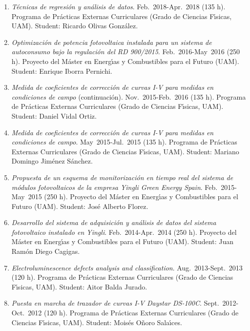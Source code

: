 \documentclass{article}
\begin{document}
\begin{enumerate}
\item
{\it T\'ecnicas de regresi\'on y an\'alisis de datos}.
Feb.~2018-Apr.~2018 (135 h). Programa de Pr\'acticas Externas Curriculares (Grado de Ciencias F{\'\i}sicas, UAM).
Student: Ricardo Olivas Gonz\'alez.

\item
{\it Optimizaci\'on de potencia fotovoltaica instalada para un sistema de autoconsumo bajo la regulaci\'on del RD 900/2015}.
Feb.~2016-May~2016 (250 h). Proyecto del M\'aster en Energ{\'\i}as y Combustibles para el Futuro (UAM).
Student: Enrique Iborra Pernichi.

\item
{\it Medida de coeficientes de correcci\'on de curvas I-V para medidas en condiciones de campo} (conti\-nu\-aci\'on).
Nov.~2015-Feb.~2016 (135 h). Programa de Pr\'acticas Externas Curriculares (Grado de Ciencias F{\'\i}sicas, UAM).
Student: Daniel Vidal Ortiz.

\item
{\it Medida de coeficientes de correcci\'on de curvas I-V para medidas en condiciones de campo}.
May~2015-Jul.~2015 (135 h). Programa de Pr\'acticas Externas Curriculares (Grado de Ciencias F{\'\i}sicas, UAM).
Student: Mariano Domingo Jim\'enez S\'anchez.

\item
{\it Propuesta de un esquema de monitorizaci\'on en tiempo real del sistema de m\'odulos fotovoltaicos de la empresa Yingli Green Energy Spain}.
Feb.~2015-May~2015 (250 h). Proyecto del M\'aster en Energ{\'\i}as y Combustibles para el Futuro (UAM).
Student: Jos\'e Alberto Florez.

\item
{\it Desarrollo del sistema de adquisici\'on y an\'alisis de datos del sistema fotovoltaico instalado en Yingli}.
Feb.~2014-Apr.~2014 (250 h). Proyecto del M\'aster en Energ{\'\i}as y Combustibles para el Futuro (UAM).
Student: Juan Ram\'on Diego Cagigas.

\item
{\it Electroluminescence defects analysis and classification}.
Aug.~2013-Sept.~2013 (120 h). Programa de Pr\'acticas Externas Curriculares (Grado de Ciencias F{\'\i}sicas, UAM).
Student: Aitor Balda Jurado.

\item
{\it Puesta en marcha de trazador de curvas I-V Daystar DS-100C}.
Sept.~2012-Oct.~2012 (120 h). Programa de Pr\'acticas Externas Curriculares (Grado de Ciencias F{\'\i}sicas, UAM).
Student: Mois\'es O\~noro Sala\'{\i}ces. 
\end{enumerate}
\end{document}
